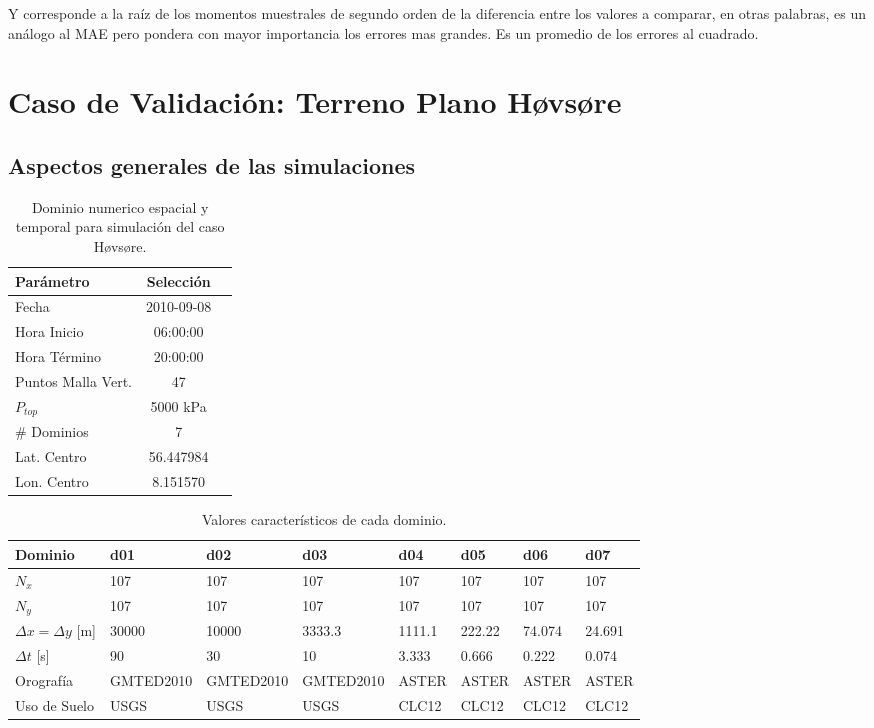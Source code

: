 Y corresponde a la raíz de los momentos muestrales de segundo orden de la diferencia entre los valores a comparar, en otras palabras, es un análogo al MAE pero pondera con mayor importancia los errores mas grandes. Es un promedio de los errores al cuadrado.
\section{Caso de Validación: Terreno Plano Høvsøre}
\subsection{Aspectos generales de las simulaciones}

\begin{table}[h!]
	\caption{Dominio numerico espacial y temporal para simulación del caso Høvsøre.}\label{tab:exp}
	\centering\footnotesize
	\begin{tabular}{lcc}
		\toprule
		Parámetro & Selección \\
		\midrule
		Fecha	 	 & 2010-09-08   \\
		Hora Inicio	 	 & 06:00:00   \\
		Hora Término	 		 & 20:00:00  \\
		Puntos Malla Vert.	 	 & 47   \\
		$P_{top}$ 	& 5000 kPa\\
		\# Dominios	& 7   \\
		Lat. Centro	& 56.447984   \\
		Lon. Centro	& 8.151570   \\
		\bottomrule
	\end{tabular}
\end{table}

\begin{table}[h!]
	\caption{Valores característicos de cada dominio.}\label{tab:param_fis}
	\centering\footnotesize
	\begin{tabular}{llllllll}
		\toprule
		Dominio 				& d01	&	d02	&	d03	&	d04	&	d05	&	d06 &	d07 \\
		\midrule
		$N_x$		& 107 & 107 & 107 &107&107&107&107  \\
		$N_y$	 		& 107 & 107 & 107 &107&107&107&107  \\
		$\Delta x = \Delta y$	[m]	 		& 30000 & 10000 & 3333.3 &1111.1&222.22&74.074&24.691  \\
		$\Delta t$	[s]	 		& 90 & 30 & 10 &3.333&0.666&0.222&0.074  \\
		Orografía		 	& GMTED2010 & GMTED2010 & GMTED2010 &ASTER&ASTER&ASTER&ASTER  \\
		Uso de Suelo					& USGS & USGS & USGS &CLC12&CLC12&CLC12&CLC12 \\
		\bottomrule
	\end{tabular}
\end{table}

